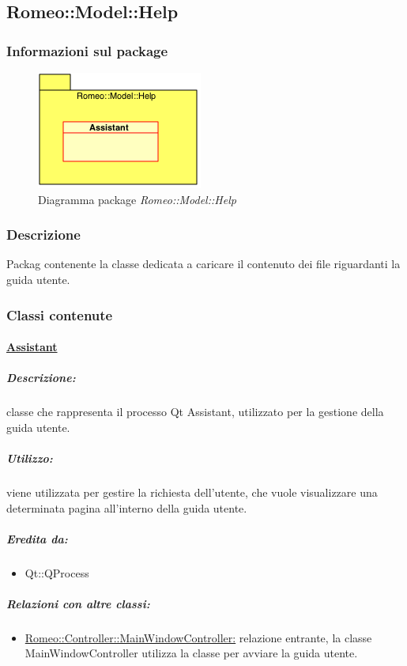 		
	\subsection{Romeo::Model::Help}
	\label{romeo::model::Help}
		\subsubsection{Informazioni sul package}
		\label{info_help}
		\begin{figure}[!h]
			\centering
			\includegraphics[width=0.6\linewidth]{./Content/Immagini/Help.png}
			\caption{Diagramma package \textsl{Romeo::Model::Help}}
			\label{comp_help}
		\end{figure}
		\subsubsection{Descrizione}
		\label{descr_help}
		Packag\g{} contenente la classe dedicata a caricare il contenuto dei file riguardanti la guida utente.
	
	\subsubsection{Classi contenute}	
		\paragraph{\underline{Assistant}}
		\label{help}
			\subparagraph{Descrizione:} classe che rappresenta il processo Qt Assistant, utilizzato per la gestione della guida utente.
		 	
		 	\subparagraph{Utilizzo:}
		 	 viene utilizzata per gestire la richiesta dell'utente, che vuole visualizzare una determinata pagina all'interno della guida utente.
		 	 
		 	 \subparagraph{Eredita da:}
		 	 		\begin{itemize}
		 	 			\item Qt::QProcess
		 	 		\end{itemize}
		 	 
		 	 \subparagraph{Relazioni con altre classi:}
		 	 	\begin{itemize}
			 	 	\item \hyperref[]{Romeo::Controller::MainWindowController:} relazione entrante, la classe MainWindowController utilizza la classe per avviare la guida utente.
		 	 	\end{itemize}
		 	 	
		 	